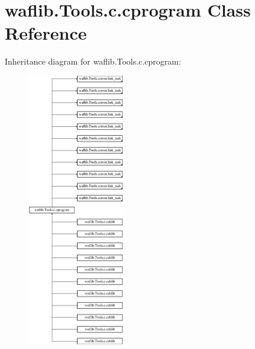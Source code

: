 \hypertarget{classwaflib_1_1_tools_1_1c_1_1cprogram}{}\section{waflib.\+Tools.\+c.\+cprogram Class Reference}
\label{classwaflib_1_1_tools_1_1c_1_1cprogram}
Inheritance diagram for waflib.\+Tools.\+c.\+cprogram\+:\begin{figure}[H]
\begin{center}
\leavevmode
\includegraphics[height=12.000000cm]{classwaflib_1_1_tools_1_1c_1_1cprogram}
\end{center}
\end{figure}
